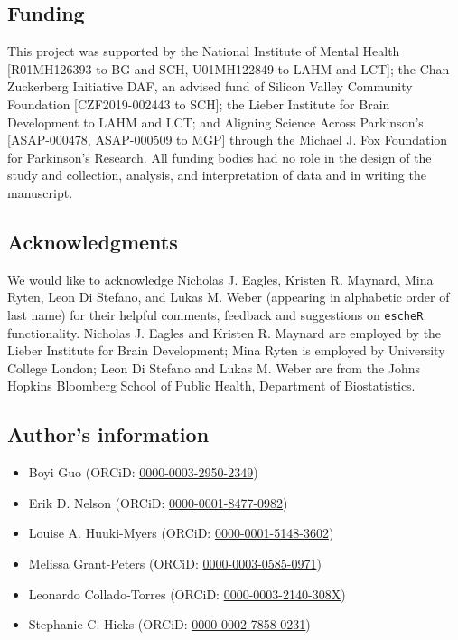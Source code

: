 \documentclass[10pt,twocolumn]{article}
\begin{document}
\subsection*{Funding}
This project was supported by the National Institute of Mental Health [R01MH126393 to BG and SCH, U01MH122849 to LAHM and LCT]; the Chan Zuckerberg Initiative DAF, an advised fund of Silicon Valley Community Foundation [CZF2019-002443 to SCH]; the Lieber Institute for Brain Development to LAHM and LCT; and Aligning Science Across Parkinson’s [ASAP-000478, ASAP-000509 to MGP] through the Michael J. Fox Foundation for Parkinson’s Research.  All funding bodies had no role in the design of the study and collection, analysis, and interpretation of data and in writing the manuscript.

\subsection*{Acknowledgments}
We would like to acknowledge Nicholas J. Eagles, Kristen R. Maynard, Mina Ryten, Leon Di Stefano, and Lukas M. Weber (appearing in alphabetic order of last name) for their helpful comments, feedback and suggestions on \texttt{escheR} functionality. Nicholas J. Eagles and Kristen R. Maynard are employed by the Lieber Institute for Brain Development; Mina Ryten is employed by University College London; Leon Di Stefano and Lukas M. Weber are from the Johns Hopkins Bloomberg School of Public Health, Department of Biostatistics. 


\subsection*{Author’s information}

\begin{itemize}[nosep]
    \item Boyi Guo (ORCiD: \href{https://orcid.org/0000-0003-2950-2349}{0000-0003-2950-2349})
    \item Erik D. Nelson (ORCiD: \href{https://orcid.org/0000-0001-8477-0982}{0000-0001-8477-0982})
    \item Louise A. Huuki-Myers (ORCiD: \href{https://orcid.org/0000-0001-5148-3602}{0000-0001-5148-3602})
    \item Melissa Grant-Peters (ORCiD: \href{https://orcid.org/0000-0003-0585-0971}{0000-0003-0585-0971})
    \item Leonardo Collado-Torres (ORCiD: \href{https://orcid.org/0000-0003-2140-308X}{0000-0003-2140-308X})
    \item Stephanie C. Hicks (ORCiD: \href{https://orcid.org/0000-0002-7858-0231}{0000-0002-7858-0231})
\end{itemize} 
\end{document}
